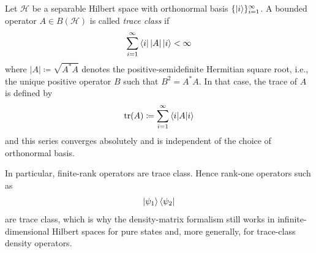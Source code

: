 \begin{definition}
Let $\mathcal H$ be a separable Hilbert space with orthonormal basis $\{\ket{i}\}_{i=1}^{\infty}$.
A bounded operator $A \in B(\mathcal H)$ is called \emph{trace class} if
\[
\sum_{i=1}^{\infty} \bra{i} |A| \ket{i} < \infty
\]
where $|A| \coloneq \sqrt{A^*A}$ denotes the positive-semidefinite Hermitian square root, i.e., the unique positive operator $B$ such that $B^2 = A^*A$.
In that case, the trace of $A$ is defined by
\[
\operatorname{tr}(A)
\coloneq
\sum_{i=1}^{\infty} \braket{i|A|i}
\]
and this series converges absolutely and is independent of the choice of orthonormal basis.
\end{definition}

In particular, finite-rank operators are trace class. Hence rank-one operators such as
\[
\ket{\psi_1}\bra{\psi_2}
\]
are trace class, which is why the density-matrix formalism still works in infinite-dimensional Hilbert spaces for pure states and, more generally, for trace-class density operators.



